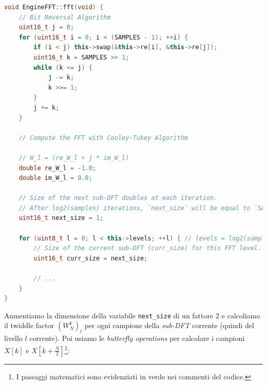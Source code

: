 \documentclass[a4paper,12pt]{report}  %
\newcommand{\lstinlinebg}[1]{\colorbox{backcolour}{\lstinline|#1|}}
\begin{document}
\begin{lstlisting}[language=C++, keywords={void, uint16_t, while, for, if, double, this, uint8_t}]
void EngineFFT::fft(void) {
    // Bit Reversal Algorithm
    uint16_t j = 0;
    for (uint16_t i = 0; i < (SAMPLES - 1); ++i) {
        if (i < j) this->swap(&this->re[i], &this->re[j]);
        uint16_t k = SAMPLES >> 1;
        while (k <= j) {
            j -= k;
            k >>= 1;
        }
        j += k;
    }

    // Compute the FFT with Cooley-Tukey Algorithm

    // W_l = (re_W_l + j * im_W_l)
    double re_W_l = -1.0;
    double im_W_l = 0.0;

    // Size of the next sub-DFT doubles at each iteration.
    // After log2(samples) iterations, `next_size` will be equal to `SAMPLES`.
    uint16_t next_size = 1;
    
    for (uint8_t l = 0; l < this->levels; ++l) { // levels = log2(samples)
        // Size of the current sub-DFT (curr_size) for this FFT level.
        uint16_t curr_size = next_size;

        // ...
    }
}
\end{lstlisting}

Aumentiamo la dimensione della variabile \lstinlinebg{next_size} di un fattore $2$ e calcoliamo il twiddle factor $\left ( W_N^{k} \right )_l$ per ogni campione della \textit{sub-DFT} corrente (quindi del livello $l$ corrente).
Poi usiamo le \textit{butterfly operations} per calcolare i campioni $X[k]$ e $X[k + \frac{N}{2}]$\footnote{I passaggi matematici sono evidenziati in verde nei commenti del codice.}:
\end{document}
